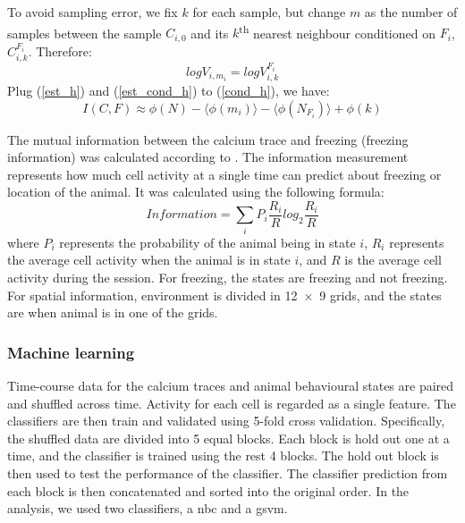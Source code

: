 To avoid sampling error, we fix $k$ for each sample, but change $m$ as the number of samples between the sample $C_{i,0}$ and its $k$\textsuperscript{th} nearest neighbour conditioned on $F_i$, $C_{i,k}^{F_i}$. Therefore:
\begin{equation*}
logV_{i, m_i} = logV_{i, k}^{F_i} 
\end{equation*}
Plug (\ref{est_h}) and (\ref{est_cond_h}) to (\ref{cond_h}), we have:
\begin{equation*}
    I(C, F) \approx \phi(N) - \langle\phi(m_i)\rangle - \langle\phi(N_{F_i})\rangle + \phi(k)
\end{equation*}






The mutual information between the calcium trace and freezing (freezing information) was calculated according to \citet{skaggs93}. The information measurement represents how much cell activity at a single time can predict about freezing or location of the animal.  It was calculated using the following formula:
\begin{equation*}
Information = \displaystyle\sum_{i}^{}P_i  \frac{R_i}{R} log_2 \frac{R_i}{R}
\end{equation*}
where $P_i$ represents the probability of the animal being in state $i$,  $R_i$ represents the average cell activity when the animal is in state $i$, and $R$ is the average cell activity during the session. For freezing, the states are freezing and not freezing. For spatial information, environment is divided in \num{12 x 9} grids, and the states are when animal is in one of the grids.

\subsubsection{Machine learning}

Time-course data for the calcium traces and animal behavioural states are paired and shuffled across time. Activity for each cell is regarded as a single feature. The classifiers are then train and validated using 5-fold cross validation. Specifically, the shuffled data are divided into 5 equal blocks. Each block is hold out one at a time, and the classifier is trained using the rest 4 blocks. The hold out block is then used to test the performance of the classifier. The classifier prediction from each block is then concatenated and sorted into the original order. In the analysis, we used two classifiers, a \gls{nbc} and a \gls{gsvm}. 


